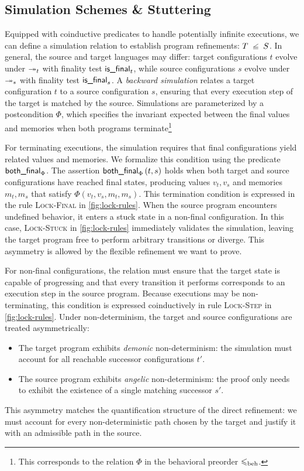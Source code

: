 \documentclass[report.tex]{subfiles}
\begin{document}
\subsection{Simulation Schemes \& Stuttering}

Equipped with coinductive predicates to handle potentially infinite
executions,
we can define a simulation relation to establish
program refinements: $T \slantsqsubseteq S$.
In general,
the source and target languages may differ:
target configurations $t$ evolve under $\step[t]{}{}$
with finality test $\isfinalf[t]$,
while source configurations $s$
evolve under $\step[s]{}{}$
with finality test $\isfinalf[s]$.
A \emph{backward simulation} relates a target configuration $t$
to a source configuration $s$,
ensuring that every execution step of the target
is matched by the source.
Simulations are parameterized by a postcondition $\Phi$,
which specifies the invariant expected between the final values and
memories when both programs terminate\footnote{
  This corresponds to the relation $\Phi$ in the behavioral preorder $\leqslant_{\text{beh}}$.
}

For terminating executions,
the simulation requires that final configurations yield related values
and memories.
We formalize this condition using the predicate $\textsf{both\_final}_{\Phi}$.
The assertion $\textsf{both\_final}_{\Phi}\left(t, s\right)$
holds when both target and source configurations have reached final states,
producing values $v_t, v_s$ and memories $m_t, m_s$
that satisfy $\Phi(v_t, v_s, m_t, m_s)$.
This termination condition is expressed in the rule
\textsc{Lock-Final} in \cref{fig:lock-rules}.
When the source program encounters undefined behavior,
it enters a stuck state in a non-final configuration.
In this case,
\textsc{Lock-Stuck} in \cref{fig:lock-rules} immediately validates the simulation,
leaving the target program free to perform arbitrary transitions or diverge.
This asymmetry is allowed by the flexible refinement we want to prove.

For non-final configurations,
the relation must ensure that the target state is capable of progressing
and that every transition it performs corresponds to an execution step
in the source program.
Because executions may be non-terminating,
this condition is expressed coinductively in rule \textsc{Lock-Step}
in \cref{fig:lock-rules}.
Under non-determinism,
the target and source configurations are treated asymmetrically:
\begin{itemize}
  \item The target program exhibits \emph{demonic} non-determinism:
        the simulation must account for all reachable successor configurations
        $t'$.

  \item The source program exhibits \emph{angelic} non-determinism:
        the proof only needs to exhibit the existence of a single matching
        successor $s'$.
\end{itemize}
This asymmetry matches the quantification structure of the direct refinement:
we must account for every non-deterministic path chosen by the target
and justify it with an admissible path in the source.
\end{document}
